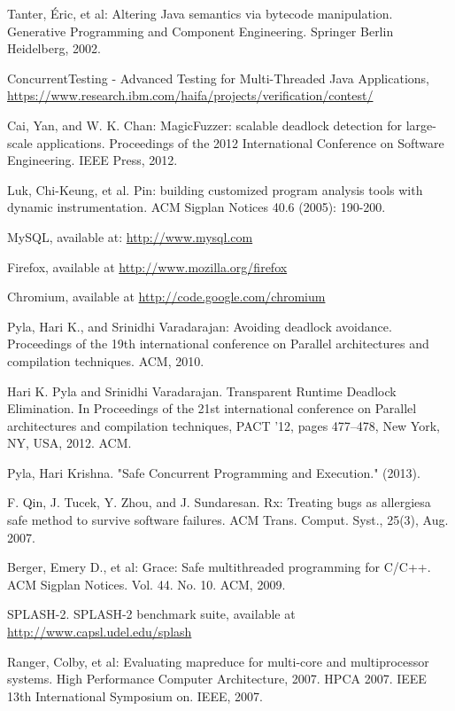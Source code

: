\begin{thebibliography}{4}
 Tanter, Éric, et al: Altering Java semantics via bytecode manipulation.
Generative Programming and Component Engineering. Springer Berlin Heidelberg, 2002.

 ConcurrentTesting - Advanced Testing for Multi-Threaded Java Applications, \url{https://www.research.ibm.com/haifa/projects/verification/contest/}

 Cai, Yan, and W. K. Chan: MagicFuzzer: scalable deadlock detection for large-scale applications.
Proceedings of the 2012 International Conference on Software Engineering. IEEE Press, 2012.

 Luk, Chi-Keung, et al. Pin: building customized program analysis tools with dynamic instrumentation.
ACM Sigplan Notices 40.6 (2005): 190-200.

 MySQL, available at: \url{http://www.mysql.com}

 Firefox, available at \url{http://www.mozilla.org/firefox}

 Chromium, available at \url{http://code.google.com/chromium}

 Pyla, Hari K., and Srinidhi Varadarajan: Avoiding deadlock avoidance.
Proceedings of the 19th international conference on Parallel architectures and compilation techniques. ACM, 2010.

 Hari K. Pyla and Srinidhi Varadarajan. Transparent Runtime Deadlock Elimination. In
Proceedings of the 21st international conference on Parallel architectures and compilation
techniques, PACT ’12, pages 477–478, New York, NY, USA, 2012. ACM.

 Pyla, Hari Krishna. "Safe Concurrent Programming and Execution." (2013).

 F. Qin, J. Tucek, Y. Zhou, and J. Sundaresan. Rx: Treating bugs as
allergiesa safe method to survive software failures. ACM Trans. Comput.
Syst., 25(3), Aug. 2007.

 Berger, Emery D., et al: Grace: Safe multithreaded programming for C/C++.
ACM Sigplan Notices. Vol. 44. No. 10. ACM, 2009.

 SPLASH-2. SPLASH-2 benchmark suite, available at \url{http://www.capsl.udel.edu/splash}

 Ranger, Colby, et al: Evaluating mapreduce for multi-core and multiprocessor systems.
High Performance Computer Architecture, 2007. HPCA 2007. IEEE 13th International Symposium on. IEEE, 2007.


\end{thebibliography}
